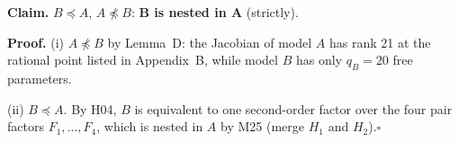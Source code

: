 \documentclass[10pt,a4paper]{article}
\newcommand{\nest}{\preceq}
\newcommand{\nnest}{\not\preceq}
\begin{document}
\par\bigskip
\noindent\textbf{Claim.} $B \nest A$, $A \nnest B$: \textbf{B is nested in A} (strictly).\par\smallskip
\noindent\textbf{Proof.} (i) $A\nnest B$ by Lemma~D: the Jacobian of model $A$ has rank 21 at the rational point listed in Appendix~B, while model $B$ has only $q_B=20$ free parameters.\par\smallskip
\noindent(ii) $B\nest A$. By H04, $B$ is equivalent to one second-order factor over the four pair factors $F_1,\dots,F_4$, which is nested in $A$ by M25 (merge $H_1$ and $H_2$).\hfill$\square$\par\medskip
{}

\clearpage
\end{document}

